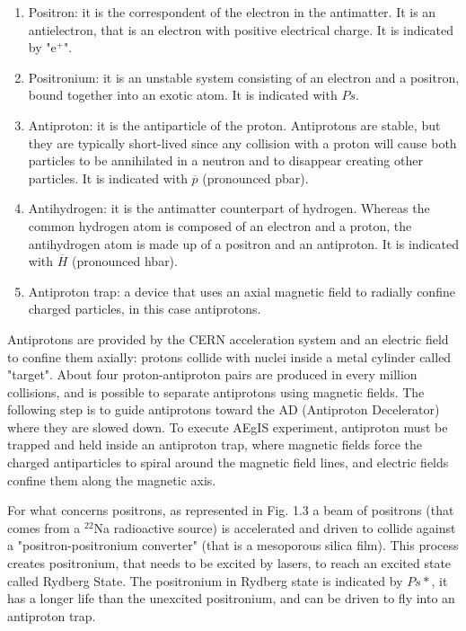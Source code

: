 \begin{enumerate}

\item Positron: it is the correspondent of the electron in the antimatter. It is an antielectron, that is an electron with positive electrical charge. It is indicated by "e$^{+}$".

\item Positronium: it is an unstable system consisting of an electron and a positron, bound together into an exotic atom. It is indicated with $ {Ps} $.

\item Antiproton: it is the antiparticle of the proton. Antiprotons are stable, but they are typically short-lived since any collision with a proton will cause both particles to be annihilated in a neutron and to disappear creating other particles. It is indicated with $ \overline{p} $ (pronounced pbar).

\item Antihydrogen: it is the antimatter counterpart of hydrogen. Whereas the common hydrogen atom is composed of an electron and a proton, the antihydrogen atom is made up of a positron and an antiproton. It is indicated with $ \overline{H} $ (pronounced hbar).


\item Antiproton trap: a device that uses an axial magnetic field to radially confine charged particles, in this case antiprotons.


\end{enumerate}

Antiprotons are provided by the CERN acceleration system and an electric field to confine them axially:
protons collide with nuclei inside a metal cylinder called "target". About four proton-antiproton pairs are produced in every million collisions, and is possible to separate antiprotons using magnetic fields. The following step is to guide antiprotons toward the AD (Antiproton Decelerator) where they are slowed down. To execute AEgIS experiment, antiproton must be trapped and held inside an antiproton trap, where magnetic fields force the charged antiparticles to spiral around the magnetic field lines, and electric fields confine them along the magnetic axis.

For what concerns positrons, as represented in Fig. 1.3 a beam of positrons (that comes from a $^{22}$Na radioactive source) is accelerated and driven to collide against a "positron-positronium converter" (that is a mesoporous silica film). This process creates positronium, that needs to be excited by lasers, to reach an excited state called Rydberg State. The positronium in Rydberg state is indicated by $ {Ps*} $, it has a longer life than the unexcited positronium, and can be driven to fly into an antiproton trap.


